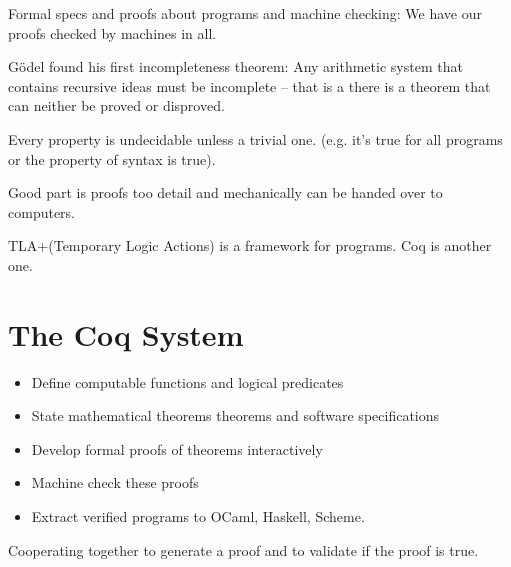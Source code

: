 Formal specs and proofs about programs and machine checking: We have our proofs
checked by machines in all. 

Gödel found his first incompleteness theorem: Any arithmetic system that
contains recursive ideas must be incomplete -- that is a there is a theorem that
can neither be proved or disproved.

 Every property is undecidable unless a trivial one. (e.g.
it's true for all programs or the property of syntax is true). 

Good part is proofs too detail and mechanically can be handed over to computers. 

 TLA+(Temporary Logic Actions) is a 
framework for programs. Coq is another one. 

\section{The Coq System}

\begin{itemize}
    \item Define computable functions and logical predicates
    \item State mathematical theorems theorems and software specifications
    \item Develop formal proofs of theorems interactively 
    \item Machine check these proofs
    \item Extract verified programs to OCaml, Haskell, Scheme. 
\end{itemize}


 Cooperating together to generate a proof and to
validate if the proof is true. 
